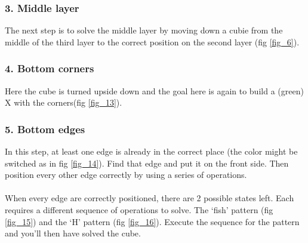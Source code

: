 \documentclass[a4paper,11pt]{kth-mag}
\begin{document}
\subsubsection{3. Middle layer}
The next step is to solve the middle layer by moving down a cubie from the middle of the third layer to the correct position on the second layer (fig \ref{fig_6}). 

\subsubsection{4. Bottom corners}
Here the cube is turned upside down and the goal here is again to build a (green) X with the corners(fig \ref{fig_13}).
\subsubsection{5. Bottom edges}
In this step, at least one edge is already in the correct place (the color might be switched as in fig \ref{fig_14}). Find that edge and put it on the front side. Then position every other edge correctly by using a series of operations.\\\\
When every edge are correctly positioned, there are 2 possible states left. Each requires a different sequence of operations to solve. The ‘fish’ pattern (fig \ref{fig_15}) and the ‘H’ pattern (fig \ref{fig_16}). Execute the sequence for the pattern and you’ll then have solved the cube.
\end{document}
